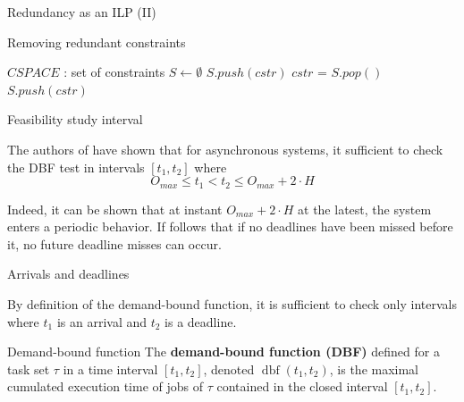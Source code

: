 \documentclass{beamer}
\newcommand{\dbf}[1]{\operatorname{dbf}(#1)}
\begin{document}
    \begin{frame}{Redundancy as an ILP (II)}

        \begin{algorithm}[H]
            \caption{Removing redundant constraints}
            \label{alg:pruneCspace}
          \begin{algorithmic}[1]
            \STATE $CSPACE$ : set of constraints
            \STATE $S \leftarrow \emptyset$
            \STATE {}
                \STATE $S.push(cstr)$
              \ENDIF
            \ENDFOR
            \STATE {}
              \STATE $cstr$ = $S.pop()$
                \STATE $S.push(cstr)$
              \ENDIF
            \ENDFOR
            \end{algorithmic}
        \end{algorithm}

    \end{frame}

    \begin{frame}{Feasibility study interval}

        The authors of \cite{leung1982complexity} have shown that for asynchronous systems, it sufficient to check the DBF test in intervals $[t_1, t_2]$ where $$O_{max} \leqslant t_1 < t_2 \leqslant O_{max} + 2 \cdot H$$

        Indeed, it can be shown that at instant $O_{max} + 2 \cdot H$ at the latest, the system enters a periodic behavior. If follows that if no deadlines have been missed before it, no future deadline misses can occur.

    \end{frame}

    \begin{frame}{Arrivals and deadlines}

        By definition of the demand-bound function, it is sufficient to check only intervals where $t_1$ is an arrival and $t_2$ is a deadline.

        \begin{block}{Demand-bound function}
            The \textbf{demand-bound function (DBF)}
            defined for a task set $\tau$ in a time interval $[t_1, t_2]$, denoted $\dbf{t_1, t_2}$, is
            the maximal cumulated execution time of jobs of $\tau$ contained in the
            closed interval $[t_1, t_2]$.
        \end{block}

    \end{frame}
\end{document}
